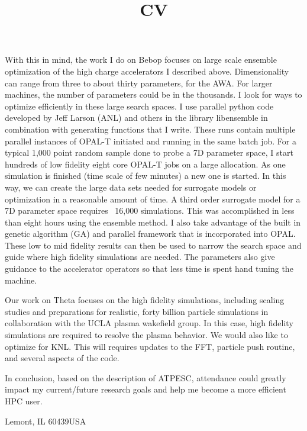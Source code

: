 \documentclass[11pt,a4paper,sans]{moderncv}        %
\begin{document}
With this in mind, the work I do on Bebop focuses on large scale ensemble optimization of the high charge accelerators I described above.
Dimensionality can range from three to about thirty parameters, 
for the AWA. For larger machines, the number of parameters could be in the 
thousands. I look for ways to optimize efficiently in these large search spaces.
I use parallel python code developed by Jeff Larson (ANL) and others in the library libensemble in combination with generating functions that I write.
These runs contain multiple parallel instances of OPAL-T initiated and running in the same batch job.
For a typical 1,000 point random sample done to probe a 7D parameter space,
I start hundreds of low fidelity eight core OPAL-T jobs on a large allocation.
As one simulation is finished (time scale of few minutes) a new one is started.
In this way, we can create the large data sets needed for surrogate models
or optimization in a reasonable amount of time. 
A third order surrogate model for a 7D parameter space requires ~16,000 simulations. 
This was accomplished in less than eight hours using the ensemble method. I also take advantage of the
built in genetic algorithm (GA) and parallel framework that is incorporated into OPAL.
These low to mid fidelity results can then be used to narrow the search space and 
guide where high fidelity simulations are needed.
The parameters also give guidance to the accelerator operators 
so that less time is spent hand tuning the machine.

Our work on Theta focuses on the high fidelity simulations,
including scaling studies and preparations for realistic, forty billion particle simulations in collaboration with the UCLA plasma wakefield group.
In this case, high fidelity simulations are required to resolve the plasma behavior.
We would also like to optimize for KNL. This will requires updates to the FFT, particle push routine, 
and several aspects of the code. 

In conclusion, based on the description of ATPESC, attendance could greatly 
impact my current/future research goals and help me become a more efficient HPC user.


\makeletterclosing

\clearpage
\fi

\title{CV}                               %
\address{9700 Cass Avenue}{Lemont, IL 60439}{USA}%
\makecvtitle
\end{document}
